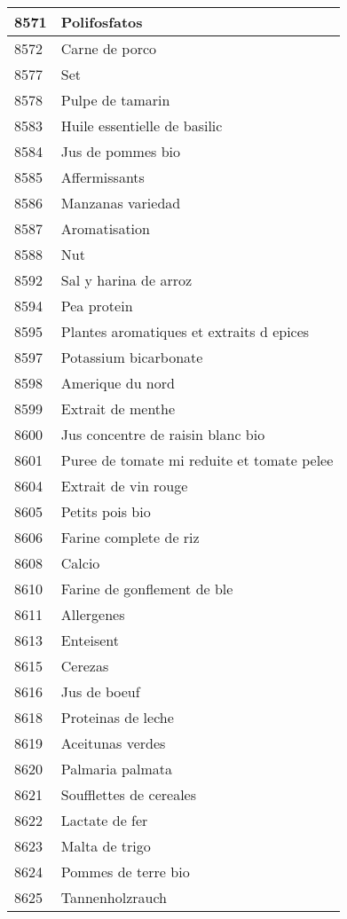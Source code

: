 \begin{longtable}{|l|l|}
8571 & Polifosfatos \\ \hline 
8572 & Carne de porco \\ \hline 
8577 & Set \\ \hline 
8578 & Pulpe de tamarin \\ \hline 
8583 & Huile essentielle de basilic \\ \hline 
8584 & Jus de pommes bio \\ \hline 
8585 & Affermissants \\ \hline 
8586 & Manzanas variedad \\ \hline 
8587 & Aromatisation \\ \hline 
8588 & Nut \\ \hline 
8592 & Sal y harina de arroz \\ \hline 
8594 & Pea protein \\ \hline 
8595 & Plantes aromatiques et extraits d epices \\ \hline 
8597 & Potassium bicarbonate \\ \hline 
8598 & Amerique du nord \\ \hline 
8599 & Extrait de menthe \\ \hline 
8600 & Jus concentre de raisin blanc bio \\ \hline 
8601 & Puree de tomate mi reduite et tomate pelee \\ \hline 
8604 & Extrait de vin rouge \\ \hline 
8605 & Petits pois bio \\ \hline 
8606 & Farine complete de riz \\ \hline 
8608 & Calcio \\ \hline 
8610 & Farine de gonflement de ble \\ \hline 
8611 & Allergenes \\ \hline 
8613 & Enteisent \\ \hline 
8615 & Cerezas \\ \hline 
8616 & Jus de boeuf \\ \hline 
8618 & Proteinas de leche \\ \hline 
8619 & Aceitunas verdes \\ \hline 
8620 & Palmaria palmata \\ \hline 
8621 & Soufflettes de cereales \\ \hline 
8622 & Lactate de fer \\ \hline 
8623 & Malta de trigo \\ \hline 
8624 & Pommes de terre bio \\ \hline 
8625 & Tannenholzrauch \\ \hline 

\end{longtable}
